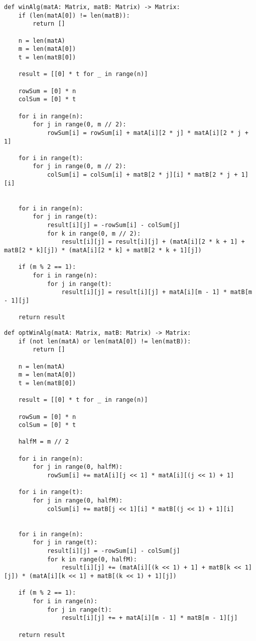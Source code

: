 \begin{center}
    \captionsetup{justification=raggedright,singlelinecheck=off}
    \begin{lstlisting}[label=lst:vin_alg,caption=Алгоритм Винограда умножения матриц]
def winAlg(matA: Matrix, matB: Matrix) -> Matrix:
	if (len(matA[0]) != len(matB)):
		return []
	
	n = len(matA)
	m = len(matA[0])
	t = len(matB[0])
	
	result = [[0] * t for _ in range(n)]
	
	rowSum = [0] * n
	colSum = [0] * t
	
	for i in range(n):
		for j in range(0, m // 2):
			rowSum[i] = rowSum[i] + matA[i][2 * j] * matA[i][2 * j + 1]
			
	for i in range(t):
		for j in range(0, m // 2):
			colSum[i] = colSum[i] + matB[2 * j][i] * matB[2 * j + 1][i]
	
	
	for i in range(n):
		for j in range(t):
			result[i][j] = -rowSum[i] - colSum[j]
			for k in range(0, m // 2):
				result[i][j] = result[i][j] + (matA[i][2 * k + 1] + matB[2 * k][j]) * (matA[i][2 * k] + matB[2 * k + 1][j])
	
	if (m % 2 == 1):
		for i in range(n):
			for j in range(t):
				result[i][j] = result[i][j] + matA[i][m - 1] * matB[m - 1][j]
	
	return result
\end{lstlisting}
\end{center}


\begin{center}
    \captionsetup{justification=raggedright,singlelinecheck=off}
    \begin{lstlisting}[label=lst:opt_vin_alg,caption=Оптимизированный алгоритм Винограда умножения матриц]
def optWinAlg(matA: Matrix, matB: Matrix) -> Matrix:
	if (not len(matA) or len(matA[0]) != len(matB)):
		return []
	
	n = len(matA)
	m = len(matA[0])
	t = len(matB[0])
	
	result = [[0] * t for _ in range(n)]
	
	rowSum = [0] * n
	colSum = [0] * t
	
	halfM = m // 2
	
	for i in range(n):
		for j in range(0, halfM):
			rowSum[i] += matA[i][j << 1] * matA[i][(j << 1) + 1]
			
	for i in range(t):
		for j in range(0, halfM):
			colSum[i] += matB[j << 1][i] * matB[(j << 1) + 1][i]
	
	
	for i in range(n):
		for j in range(t):
			result[i][j] = -rowSum[i] - colSum[j]
			for k in range(0, halfM):
				result[i][j] += (matA[i][(k << 1) + 1] + matB[k << 1][j]) * (matA[i][k << 1] + matB[(k << 1) + 1][j])
	
	if (m % 2 == 1):
		for i in range(n):
			for j in range(t):
				result[i][j] += + matA[i][m - 1] * matB[m - 1][j]
	
	return result
\end{lstlisting}
\end{center}




